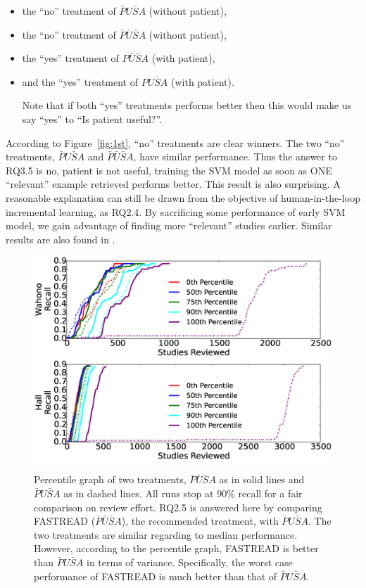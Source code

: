 \documentclass[final,twocolumn,5p]{elsarticle}
\theoremstyle{break}
\begin{document}
\begin{itemize}
\item the ``no'' treatment of $\bar{P}U\bar{S}A$ (without patient),
\item the ``no'' treatment of $\bar{P}\bar{U}\bar{S}A$ (without patient),
\item the ``yes'' treatment of $P\bar{U}\bar{S}A$ (with patient), 
\item and the ``yes'' treatment of $PU\bar{S}A$ (with patient). 

Note that if both ``yes'' treatments performs better then this would make us say ``yes'' to ``Is patient useful?''.
\end{itemize}

According to Figure~\ref{fig:1st}, ``no'' treatments are clear winners. The two ``no'' treatments, $\bar{P}U\bar{S}A$ and $\bar{P}\bar{U}\bar{S}A$, have similar performance. Thus the answer to RQ3.5 is no, patient is not useful, training the SVM model as soon as ONE ``relevant'' example retrieved performs better. This result is also surprising. A reasonable explanation can still be drawn from the objective of human-in-the-loop incremental learning, as RQ2.4. By sacrificing some performance of early SVM model, we gain advantage of finding more ``relevant'' studies earlier. Similar results are also found in \cite{cormack2014evaluation}.



\begin{figure}[t]
    \centering
    \includegraphics[width=0.48\linewidth]{percentile_Wahono.eps}
    \includegraphics[width=0.48\linewidth]{percentile_Hall.eps}
    \caption{Percentile graph of two treatments, $\bar{P}\bar{U}\bar{S}A$ as in solid lines and $\bar{P}U\bar{S}A$ as in dashed lines. All runs stop at $90\%$ recall for a fair comparison on review effort. RQ2.5 is answered here by comparing FASTREAD ($\bar{P}\bar{U}\bar{S}A$), the recommended treatment, with $\bar{P}U\bar{S}A$. The two treatments are similar regarding to median performance. However, according to the percentile graph, FASTREAD is better than $\bar{P}U\bar{S}A$ in terms of variance. Specifically, the worst case performance of FASTREAD is much better than that of $\bar{P}U\bar{S}A$.}
    \label{fig:percentile}
\end{figure}
\end{document}
